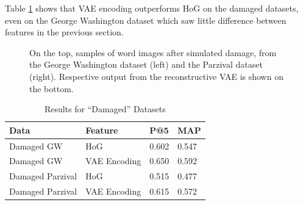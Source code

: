 \documentclass[final]{ukthesis}
\begin{document}
Table \ref{tab:damaged-results} shows that VAE encoding outperforms HoG on the damaged datasets, even on the George Washington dataset which saw little difference between features in the previous section.

\begin{figure}[t]
\begin{center}
\end{center}
\caption{On the top, samples of word images after simulated damage, from the George Washington dataset (left) and the Parzival dataset (right). Respective output from the reconstructive VAE is shown on the bottom.}
\label{fig:damaged-word-samples}
\end{figure}

\begin{table}[h]
\centering
\begin{tabular}{llll}
\textbf{Data}  & \textbf{Feature} & \textbf{P@5} & \textbf{MAP} \\
\hline
Damaged GW    & HoG			& 0.602          & 0.547          \\
Damaged GW    & VAE Encoding 	& 0.650          & 0.592          \\
Damaged Parzival & HoG                     & 0.515          & 0.477          \\
Damaged Parzival & VAE Encoding 	& 0.615          & 0.572          \\   
\end{tabular}
\caption{Results for ``Damaged'' Datasets}
\label{tab:damaged-results}
\end{table}
\end{document}
